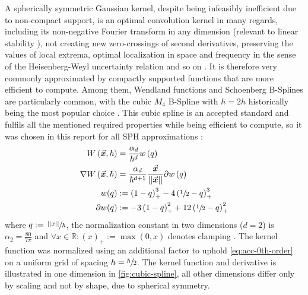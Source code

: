 \documentclass[conference]{IEEEtran}
\newcommand\abss[1]{\left|\left|#1\right|\right|}
\newcommand\vek[1]{\vec{\bm{#1}}}
\newcommand\br[1]{\left(#1\right)}
\begin{document}
A spherically symmetric Gaussian kernel, despite being infeasibly inefficient due to non-compact support, is an optimal convolution kernel in many regards, including its non-negative Fourier transform in any dimension (relevant to linear stability \cite{liu2010}), not creating new zero-crossings of second derivatives, preserving the values of local extrema, optimal localization in space and frequency in the sense of the Heisenberg-Weyl uncertainty relation and so on \cite{gaussian-optimal}. It is therefore very commonly approximated by compactly supported functions that are more efficient to compute. Among them, Wendland functions \cite{kernel-comparison-improv-convergence} and Schoenberg B-Splines \cite{price2012} are particularly common, with the cubic $M_4$ B-Spline with $\hbar=2h$ historically being the most popular choice \cites{liu2010}{sph-monaghan-92}. This cubic spline is an accepted standard and fulfils all the mentioned required properties while being efficient to compute, so it was chosen in this report for all SPH approximations \cite{band-phd}:
\begin{equation}\label{eq:cubic-spline}
\begin{aligned}
  W\br{\vek{x}, \hbar} &= \frac{\alpha_d}{\hbar^d}w\br{q}\\
  \nabla W\br{\vek{x}, \hbar} &= \frac{\alpha_d}{\hbar^{d+1}}\frac{\vek{x}}{\abss{\vek{x}}} \partial w\br{q}\\
  w(q) &:= \br{1-q}^3_+ - 4\br{\sfrac{1}{2}-q}^3_+\\
  \partial w(q) &:= -3\br{1-q}^2_+ +12\br{\sfrac{1}{2}-q}^2_+\\
\end{aligned}
\end{equation}
where $q:=\sfrac{\abss{x}}{\hbar}$, the normalization constant in two dimensions ($d=2$) is $\alpha_2 = \frac{80}{7\pi}$ and $\forall x\in\mathds{R}: \br{x}_+ := \max(0, x)$ denotes clamping \cite{band-phd}. The kernel function was normalized using an additional factor to uphold \autoref{eq:acc-0th-order} on a uniform grid of spacing $h=\sfrac{\hbar}{2}$. The kernel function and derivative is illustrated in one dimension in \autoref{fig:cubic-spline}, all other dimensions differ only by scaling and not by shape, due to spherical symmetry.
\end{document}
